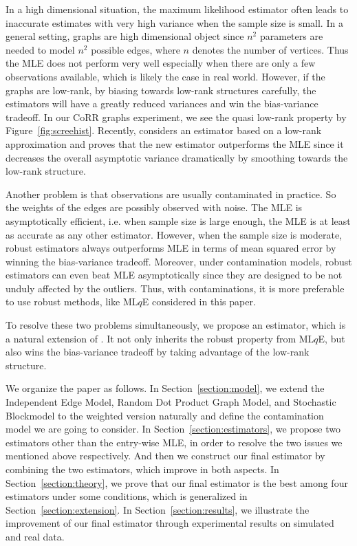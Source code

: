 \documentclass[a4paper]{article}
\begin{document}
In a high dimensional situation, the maximum likelihood estimator often leads to inaccurate estimates with very high variance when the sample size is small. In a general setting, graphs are high dimensional object since $n^2$ parameters are needed to model $n^2$ possible edges, where $n$ denotes the number of vertices. Thus the MLE does not perform very well especially when there are only a few observations available, which is likely the case in real world.
However, if the graphs are low-rank, by biasing towards low-rank structures carefully, the estimators will have a greatly reduced variances and win the bias-variance tradeoff. In our CoRR graphs experiment, we see the quasi low-rank property by Figure~\ref{fig:screehist}. Recently, \citet{tang2016law} considers an estimator based on a low-rank approximation and proves that the new estimator outperforms the MLE since it decreases the overall asymptotic variance dramatically by smoothing towards the low-rank structure.

Another problem is that observations are usually contaminated in practice. So the weights of the edges are possibly observed with noise.
The MLE is asymptotically efficient, i.e. when sample size is large enough, the MLE is at least as accurate as any other estimator. However, when the sample size is moderate, robust estimators always outperforms MLE in terms of mean squared error by winning the bias-variance tradeoff. Moreover, under contamination models, robust estimators can even beat MLE asymptotically since they are designed to be not unduly affected by the outliers. Thus, with contaminations, it is more preferable to use robust methods, like ML$q$E \citep{ferrari2010, qin2013maximum} considered in this paper.

To resolve these two problems simultaneously, we propose an estimator, which is a natural extension of \citep{tang2016law}. It not only inherits the robust property from ML$q$E, but also wins the bias-variance tradeoff by taking advantage of the low-rank structure.

We organize the paper as follows. In Section~\ref{section:model}, we extend the Independent Edge Model, Random Dot Product Graph Model, and Stochastic Blockmodel to the weighted version naturally and define the contamination model we are going to consider. In Section~\ref{section:estimators}, we propose two estimators other than the entry-wise MLE, in order to resolve the two issues we mentioned above respectively. And then we construct our final estimator by combining the two estimators, which improve in both aspects. In Section~\ref{section:theory}, we prove that our final estimator is the best among four estimators under some conditions, which is generalized in Section~\ref{section:extension}. In Section~\ref{section:results}, we illustrate the improvement of our final estimator through experimental results on simulated and real data.
\end{document}
